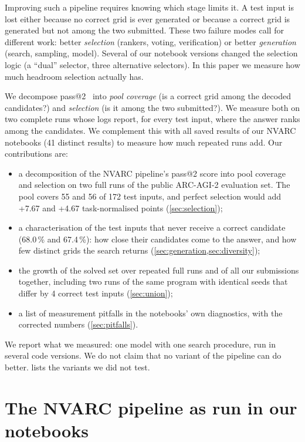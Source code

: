 \documentclass[11pt]{article}
\begin{document}
Improving such a pipeline requires knowing which stage limits it. A test input is lost either because no correct grid is ever generated or because a correct grid is generated but not among the two submitted. These two failure modes call for different work: better \emph{selection} (rankers, voting, verification) or better \emph{generation} (search, sampling, model).
Several of our notebook versions changed the selection logic (a ``dual'' selector, three alternative selectors). In this paper we measure how much headroom selection actually has.

We decompose pass@2~\citep{chen2021codex} into \emph{pool coverage} (is a correct grid among the decoded candidates?) and \emph{selection} (is it among the two submitted?). We measure both on two complete runs whose logs report, for every test input, where the answer ranks among the candidates.
We complement this with all saved results of our NVARC notebooks (41 distinct results) to measure how much repeated runs add.
Our contributions are:
\begin{itemize}
\item a decomposition of the NVARC pipeline's pass@2 score into pool coverage and selection on two full runs of the public ARC-AGI-2 evaluation set. The pool covers 55 and 56 of 172 test inputs, and perfect selection would add +7.67 and +4.67 task-normalised points (\cref{sec:selection});
\item a characterisation of the test inputs that never receive a correct candidate (68.0\,\% and 67.4\,\%): how close their candidates come to the answer, and how few distinct grids the search returns (\cref{sec:generation,sec:diversity});
\item the growth of the solved set over repeated full runs and of all our submissions together, including two runs of the same program with identical seeds that differ by 4 correct test inputs (\cref{sec:union});
\item a list of measurement pitfalls in the notebooks' own diagnostics, with the corrected numbers (\cref{sec:pitfalls}).
\end{itemize}
We report what we measured: one model with one search procedure, run in several code versions. We do not claim that no variant of the pipeline can do better.  lists the variants we did not test.

\section{The NVARC pipeline as run in our notebooks}
\label{sec:pipeline}
\end{document}
